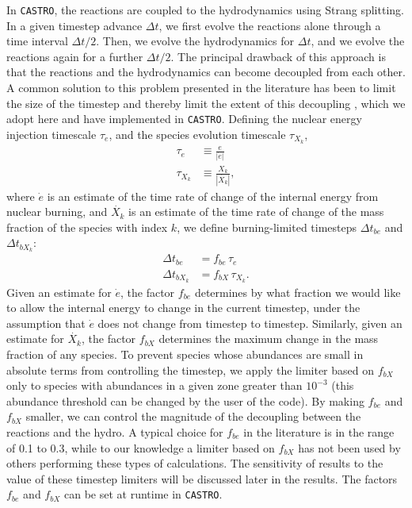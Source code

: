 \documentclass[twocolumn,numberedappendix]{../aastex6}
\newcommand{\castro}{\texttt{CASTRO}}
\begin{document}
In \castro, the reactions are coupled to the hydrodynamics using Strang splitting.
In a given timestep advance $\Delta t$, we first evolve the reactions alone through
a time interval $\Delta t / 2$. Then, we evolve the hydrodynamics for $\Delta t$,
and we evolve the reactions again for a further $\Delta t / 2$. The principal
drawback of this approach is that the reactions and the hydrodynamics can become
decoupled from each other. A common solution to this problem presented in
the literature has been to limit the size of the timestep and thereby limit the
extent of this decoupling \citep{raskin:2010,hawley:2012}, which we adopt here 
and have implemented in \castro. Defining the nuclear energy injection timescale 
$\tau_e$, and the species evolution timescale $\tau_{X_k}$,
\begin{align}
  \tau_e &\equiv \frac{e}{|\dot{e}|} \\
  \tau_{X_k} &\equiv \frac{X_k}{|\dot{X_k}|},
\end{align}
where $\dot{e}$ is an estimate of the time rate of change of the internal energy
from nuclear burning, and $\dot{X_k}$ is an estimate of the time rate of change 
of the mass fraction of the species with index $k$, we define burning-limited 
timesteps $\Delta t_{be}$ and $\Delta t_{bX_k}$:
\begin{align}
  \Delta t_{be} &= f_{be}\, \tau_e \label{eq:timestep_e}\\
  \Delta t_{bX_k} &= f_{bX}\, \tau_{X_k}. \label{eq:timestep_X}
\end{align}
Given an estimate for $\dot{e}$, the factor $f_{be}$ determines by what 
fraction we would like to allow the internal energy to change
in the current timestep, under the assumption that $\dot{e}$ does not change from
timestep to timestep. Similarly, given an estimate for $\dot{X_k}$, the factor $f_{bX}$ 
determines the maximum change in the mass fraction of any species. To prevent species
whose abundances are small in absolute terms from controlling the timestep, we apply
the limiter based on $f_{bX}$ only to species with abundances in a given zone greater
than $10^{-3}$ (this abundance threshold can be changed by the user of the code). By making 
$f_{be}$ and $f_{bX}$ smaller, we can control the magnitude of the decoupling 
between the reactions and the hydro. A typical choice for $f_{be}$ in the
literature is in the range of 0.1 to 0.3, while to our knowledge a limiter based on
$f_{bX}$ has not been used by others performing these types of calculations. The sensitivity
of results to the value of these timestep limiters will be discussed later in the
results. The factors $f_{be}$ and $f_{bX}$ can be set at runtime in \castro.
\end{document}
